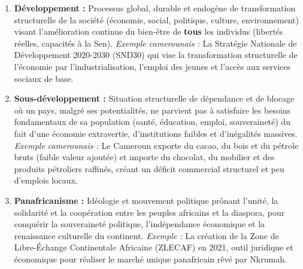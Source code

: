 \documentclass[11pt]{article}
\newcounter{popsec}
\newcounter{popsub}
\newcommand{\courssub}[1]{%
  \stepcounter{popsub}%
  \par\vspace{9pt}\noindent{\popxbold\fontsize{11.5}{13}\selectfont\color{popink}{\color{poporange}\thepopsec.\thepopsub}\hspace{6pt}#1}\par\nopagebreak\vspace{4pt}
}
\begin{document}
\courssub{Exercice 3 — Définitions}
\begin{corrige}
\begin{enumerate}
\item \textbf{Développement :} Processus global, durable et endogène de transformation structurelle de la société (économie, social, politique, culture, environnement) visant l'amélioration continue du bien-être de \textbf{tous} les individus (libertés réelles, capacités \`a la Sen). \textit{Exemple camerounais :} La Stratégie Nationale de Développement 2020-2030 (SND30) qui vise la transformation structurelle de l'économie par l'industrialisation, l'emploi des jeunes et l'accès aux services sociaux de base.
\item \textbf{Sous-développement :} Situation structurelle de dépendance et de blocage où un pays, malgré ses potentialités, ne parvient pas à satisfaire les besoins fondamentaux de sa population (santé, éducation, emploi, souveraineté) du fait d'une économie extravertie, d'institutions faibles et d'inégalités massives. \textit{Exemple camerounais :} Le Cameroun exporte du cacao, du bois et du pétrole bruts (faible valeur ajoutée) et importe du chocolat, du mobilier et des produits pétroliers raffinés, créant un déficit commercial structurel et peu d'emplois locaux.
\item \textbf{Panafricanisme :} Idéologie et mouvement politique prônant l'unité, la solidarité et la coopération entre les peuples africains et la diaspora, pour conquérir la souveraineté politique, l'indépendance économique et la renaissance culturelle du continent. \textit{Exemple :} La création de la Zone de Libre-Échange Continentale Africaine (ZLECAF) en 2021, outil juridique et économique pour réaliser le marché unique panafricain rêvé par Nkrumah.
\end{enumerate}
\end{corrige}
\end{document}
